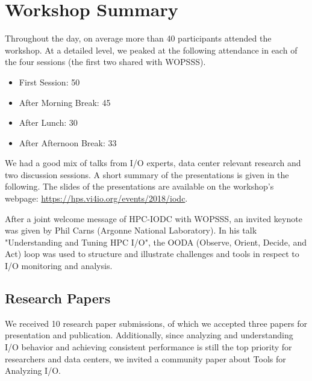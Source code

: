 \documentclass{llncs}
\begin{document}
\section{Workshop Summary}
\label{sec:summary}

Throughout the day, on average more than 40 participants attended the workshop.
At a detailed level, we peaked at the following attendance in each of the four sessions (the first two
shared with WOPSSS).
\begin{itemize}
\item First Session: 50
\item After Morning Break: 45
\item After Lunch: 30
\item After Afternoon Break: 33
\end{itemize}
We had a good mix of talks from I/O experts, data center relevant research and  two discussion sessions.
A short summary of the presentations is given in the following.
The slides of the presentations are available on the workshop's webpage:
\url{https://hps.vi4io.org/events/2018/iodc}.

After a joint welcome message of HPC-IODC with WOPSSS, an invited keynote was given by Phil Carns (Argonne National Laboratory).
In his talk "Understanding and Tuning HPC I/O", the OODA (Observe, Orient, Decide, and Act) loop was used to structure and illustrate challenges and tools in respect to I/O monitoring and analysis.


\subsection{Research Papers}

We received 10 research paper submissions, of which we accepted three papers for presentation and publication.
Additionally, since analyzing and understanding I/O behavior and achieving consistent performance is still the top priority for researchers and data centers, we invited a community paper about Tools for Analyzing I/O.
\end{document}
